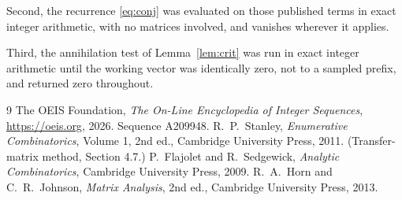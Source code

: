 \documentclass[11pt,a4paper]{article}
\theoremstyle{plain}
\theoremstyle{definition}
\begin{document}
Second, the recurrence \eqref{eq:conj} was evaluated on those published terms in exact
integer arithmetic, with no matrices involved, and vanishes wherever it applies.

Third, the annihilation test of Lemma~\ref{lem:crit} was run in exact integer arithmetic
until the working vector was identically zero, not to a sampled prefix, and returned zero
throughout.

\begin{thebibliography}{9}
 The OEIS Foundation, \emph{The On-Line Encyclopedia of Integer
Sequences}, \url{https://oeis.org}, 2026. Sequence A209948.
 R.~P.~Stanley, \emph{Enumerative Combinatorics}, Volume 1, 2nd ed.,
Cambridge University Press, 2011. (Transfer-matrix method, Section 4.7.)
 P.~Flajolet and R.~Sedgewick, \emph{Analytic Combinatorics}, Cambridge
University Press, 2009.
 R.~A.~Horn and C.~R.~Johnson, \emph{Matrix Analysis}, 2nd ed., Cambridge
University Press, 2013.
\end{thebibliography}
\end{document}
